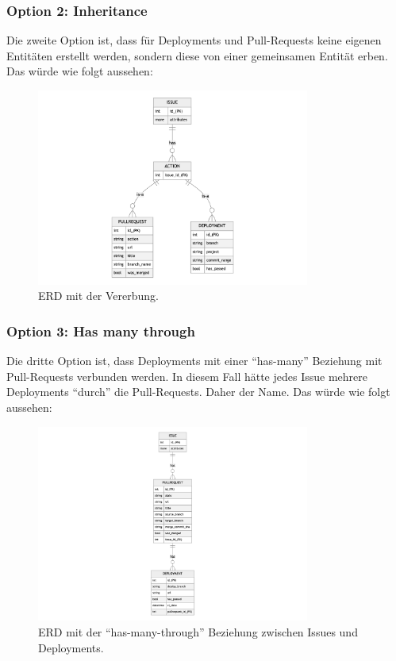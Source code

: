 \subsubsection{Option 2: Inheritance}
Die zweite Option ist, dass für Deployments und Pull-Requests keine eigenen Entitäten erstellt werden, sondern diese von
einer gemeinsamen Entität erben. Das würde wie folgt aussehen:
\begin{figure}[H]
  \centering
  \includegraphics[width=0.8\textwidth]{images/erd/inheritance.png}
  \caption[Ein ERD, welches die Vererbung zwischen Issues und Deployments mit dem Parent Action aufzeigt.]{ERD mit der Vererbung.}
  \label{fig:erd_inheritance}
\end{figure}

\subsubsection{Option 3: Has many through}
Die dritte Option ist, dass Deployments mit einer \enquote{has-many} Beziehung mit Pull-Requests verbunden werden. In diesem Fall hätte jedes
Issue mehrere Deployments \enquote{durch} die Pull-Requests. Daher der Name. Das würde wie folgt aussehen:
\begin{figure}[H]
  \centering
  \includegraphics[width=0.8\textwidth]{images/erd/has_many_through.png}
  \caption[Ein ERD, welches die \enquote{has-many-through} Beziehung zwischen Issues und Deployments aufzeigt.]{ERD mit der \enquote{has-many-through} Beziehung zwischen Issues und Deployments.}
  \label{fig:erd_has_many_through}
\end{figure}

